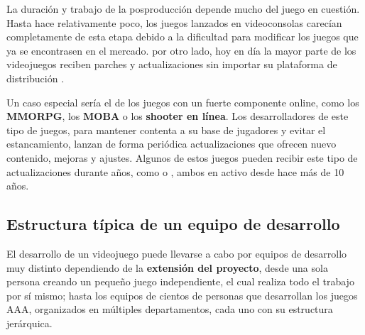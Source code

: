 La duración y trabajo de la posproducción depende mucho del juego en cuestión. Hasta hace relativamente poco, los juegos lanzados en videoconsolas carecían completamente de esta etapa debido a la dificultad para modificar los juegos que ya se encontrasen en el mercado. por otro lado, hoy en día la mayor parte de los videojuegos reciben parches y actualizaciones sin importar su plataforma de distribución \cite{development_and_production}.

Un caso especial sería el de los juegos con un fuerte componente online, como los \textbf{MMORPG}, los \textbf{MOBA} o los \textbf{shooter en línea}. Los desarrolladores de este tipo de juegos, para mantener contenta a su base de jugadores y evitar el estancamiento, lanzan de forma periódica actualizaciones que ofrecen nuevo contenido, mejoras y ajustes. Algunos de estos juegos pueden recibir este tipo de actualizaciones durante años, como  o , ambos en activo desde hace más de 10 años.

\subsection{Estructura típica de un equipo de desarrollo}
El desarrollo de un videojuego puede llevarse a cabo por equipos de desarrollo muy distinto dependiendo de la \textbf{extensión del proyecto}, desde una sola persona creando un pequeño juego independiente, el cual realiza todo el trabajo por sí mismo; hasta los equipos de cientos de personas que desarrollan los juegos AAA, organizados en múltiples departamentos, cada uno con su estructura jerárquica.

